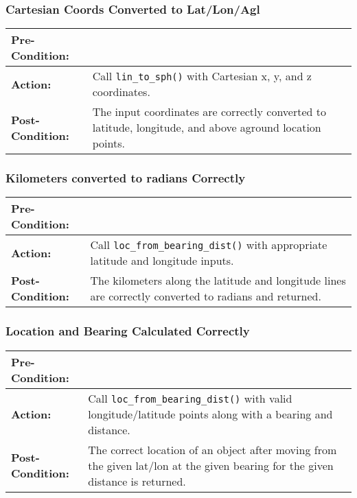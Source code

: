 \documentclass[titlepage]{article}
\newcommand{\testcase}[3]{
    \begin{center}
    \begin{tabular}{| l | p{0.7\textwidth}|}
        \hline
        \rowcolor[gray]{0.8}\textbf{Pre-Condition:} & #1 \\ \hline
        \textbf{Action:} & #2 \\ \hline
        \rowcolor[gray]{0.8}\textbf{Post-Condition:} & #3 \\ \hline
    \end{tabular}
    \end{center}
}
\begin{document}
\subsubsection{Cartesian Coords Converted to Lat/Lon/Agl}
\testcase{}{Call \texttt{lin\_to\_sph()} with Cartesian x, y, and z coordinates.}{The input coordinates are correctly converted to latitude, longitude, and above aground location points.}

\subsubsection{Kilometers converted to radians Correctly}
\testcase{}{Call \texttt{loc\_from\_bearing\_dist()} with appropriate latitude and longitude inputs.}{The kilometers along the latitude and longitude lines are correctly converted to radians and returned.}

\subsubsection{Location and Bearing Calculated Correctly}
\testcase{}{Call \texttt{loc\_from\_bearing\_dist()} with valid longitude/latitude points along with a bearing and
distance.}{The correct location of an object after moving from the given lat/lon at the given bearing for the given
distance is returned.}

\pagebreak
\appendix
\appendixpage
\end{document}
